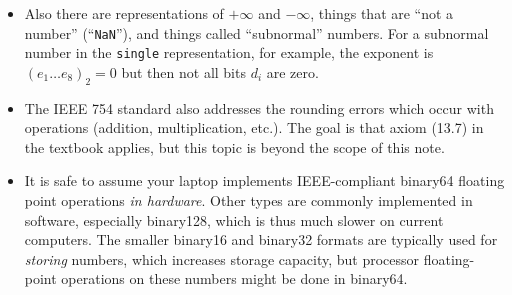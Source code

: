 \documentclass[11pt]{amsart}
\begin{document}
\begin{itemize}
\item Also there are representations of $+\infty$ and $-\infty$, things that are ``not a number'' (``\texttt{NaN}''), and things called ``subnormal'' numbers.  For a subnormal number in the \texttt{single} representation, for example, the exponent is $\left(e_1\dots e_8\right)_2 = 0$ but then not all bits $d_i$ are zero.

\item The IEEE 754 standard also addresses the rounding errors which occur with operations (addition, multiplication, etc.).  The goal is that axiom (13.7) in the textbook applies, but this topic is beyond the scope of this note.

\item It is safe to assume your laptop implements IEEE-compliant binary64 floating point operations \emph{in hardware}.  Other types are commonly implemented in software, especially binary128, which is thus much slower on current computers.  The smaller binary16 and binary32 formats are typically used for \emph{storing} numbers, which increases storage capacity, but processor floating-point operations on these numbers might be done in binary64.

\end{itemize}
\end{document}
